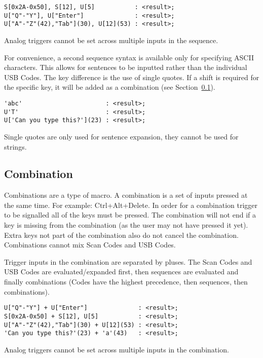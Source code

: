 \documentclass{kiibohd-template}
\begin{document}
\begin{lstlisting}
S[0x2A-0x50], S[12], U[5]           : <result>;
U["Q"-"Y"], U["Enter"]              : <result>;
U["A"-"Z"(42),"Tab"](30), U[12](53) : <result>;
\end{lstlisting}

Analog triggers cannot be set across multiple inputs in the sequence.

For convenience, a second sequence syntax is available only for specifying ASCII characters.
This allows for sentences to be inputted rather than the individual USB Codes.
The key difference is the use of single quotes.
If a shift is required for the specific key, it will be added as a combination (see Section~\ref{subsec:Combination}).

\begin{lstlisting}
'abc'                       : <result>;
U'T'                        : <result>;
U['Can you type this?'](23) : <result>;
\end{lstlisting}

Single quotes are only used for sentence expansion, they cannot be used for strings.


\subsection{Combination}
\label{subsec:Combination}

Combinations are a type of macro.
A combination is a set of inputs pressed at the same time.
For example: Ctrl+Alt+Delete.
In order for a combination trigger to be signalled all of the keys must be pressed.
The combination will not end if a key is missing from the combination (as the user may not have pressed it yet).
Extra keys not part of the combination also do not cancel the combination.
Combinations cannot mix Scan Codes and USB Codes.

Trigger inputs in the combination are separated by pluses.
The Scan Codes and USB Codes are evaluated/expanded first, then sequences are evaluated and finally combinations (Codes have the highest precedence, then sequences, then combinations).

\begin{lstlisting}
U["Q"-"Y"] + U["Enter"]              : <result>;
S[0x2A-0x50] + S[12], U[5]           : <result>;
U["A"-"Z"(42),"Tab"](30) + U[12](53) : <result>;
'Can you type this?'(23) + 'a'(43)   : <result>;
\end{lstlisting}

Analog triggers cannot be set across multiple inputs in the combination.
\end{document}
